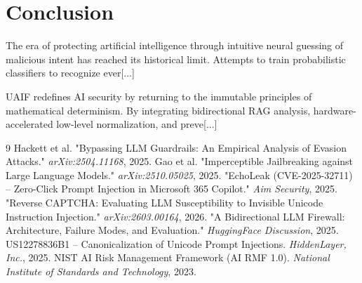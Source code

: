 \documentclass[10pt,a4paper]{article}
\begin{document}
\section{Conclusion}
The era of protecting artificial intelligence through intuitive neural guessing of malicious intent has reached its historical limit. Attempts to train probabilistic classifiers to recognize ever[...]

UAIF redefines AI security by returning to the immutable principles of mathematical determinism. By integrating bidirectional RAG analysis, hardware-accelerated low-level normalization, and preve[...]

\begin{thebibliography}{9}
 Hackett et al. "Bypassing LLM Guardrails: An Empirical Analysis of Evasion Attacks." \emph{arXiv:2504.11168}, 2025.
 Gao et al. "Imperceptible Jailbreaking against Large Language Models." \emph{arXiv:2510.05025}, 2025.
 "EchoLeak (CVE-2025-32711) -- Zero-Click Prompt Injection in Microsoft 365 Copilot." \emph{Aim Security}, 2025.
 "Reverse CAPTCHA: Evaluating LLM Susceptibility to Invisible Unicode Instruction Injection." \emph{arXiv:2603.00164}, 2026.
 "A Bidirectional LLM Firewall: Architecture, Failure Modes, and Evaluation." \emph{HuggingFace Discussion}, 2025.
 US12278836B1 -- Canonicalization of Unicode Prompt Injections. \emph{HiddenLayer, Inc.}, 2025.
 NIST AI Risk Management Framework (AI RMF 1.0). \emph{National Institute of Standards and Technology}, 2023.
\end{thebibliography}
\end{document}
